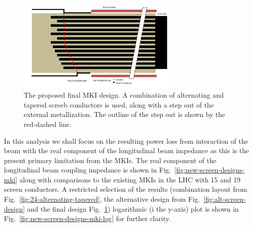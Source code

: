\begin{figure}
\begin{center}
\includegraphics[width=0.7\textwidth]{LHC_MKI/figures/mki-design-layouts/mki-final-design.pdf}
\end{center}
\label{fig:24-final-design}
\caption{The proposed final MKI design. A combination of alternating and tapered screeb conductors is used, along with a step out of the external metallization. The outline of the step out is shown by the red-dashed line.}
\end{figure}

In this analysis we shall focus on the resulting power loss from interaction of the beam with the real component of the longitudinal beam impedance as this is the present primary limitation from the MKIs. The real component of the longitudinal beam coupling impedance is shown in Fig.~\ref{fig:new-screen-designs-mki} along with comparisons to the existing MKIs in the LHC with 15 and 19 screen conductors. A restricted selection of the results (combination layout from Fig.~\ref{fig:24-alternating-tapered}, the alternative design from Fig.~\ref{fig:alt-screen-design} and the final design Fig.~\ref{fig:24-final-design}) logarithmic (i the y-axis) plot is shown in Fig.~\ref{fig:new-screen-designs-mki-log} for further clarity.

